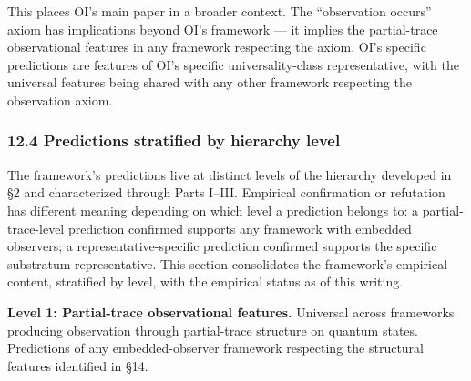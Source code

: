 \documentclass[
]{article}
\begin{document}
This places OI's main paper in a broader context. The ``observation
occurs'' axiom has implications beyond OI's framework --- it implies the
partial-trace observational features in any framework respecting the
axiom. OI's specific predictions are features of OI's specific
universality-class representative, with the universal features being
shared with any other framework respecting the observation axiom.

\hypertarget{predictions-stratified-by-hierarchy-level-1}{%
\subsubsection{12.4 Predictions stratified by hierarchy
level}\label{predictions-stratified-by-hierarchy-level-1}}

The framework's predictions live at distinct levels of the hierarchy
developed in §2 and characterized through Parts I--III. Empirical
confirmation or refutation has different meaning depending on which
level a prediction belongs to: a partial-trace-level prediction
confirmed supports any framework with embedded observers; a
representative-specific prediction confirmed supports the specific
substratum representative. This section consolidates the framework's
empirical content, stratified by level, with the empirical status as of
this writing.

\textbf{Level 1: Partial-trace observational features.} Universal across
frameworks producing observation through partial-trace structure on
quantum states. Predictions of any embedded-observer framework
respecting the structural features identified in §14.
\end{document}
